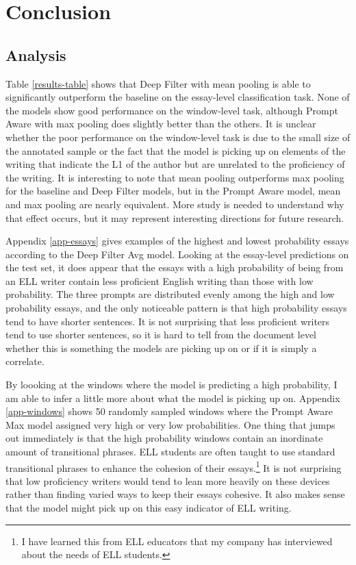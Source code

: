 \documentclass{article} %
\begin{document}
\section{Conclusion} \label{conclusion}

\subsection{Analysis} \label{analysis}

Table \ref{results-table} shows that Deep Filter with mean pooling is able to
significantly outperform the baseline on the essay-level classification task.
None of the models show good performance on the window-level task,
although Prompt Aware with max pooling does slightly better than the others.
It is unclear whether the poor performance on the window-level task is due to
the small size of the annotated sample or the fact that the model is picking
up on elements of the writing that indicate the L1 of the author but are unrelated
to the proficiency of the writing. It is interesting to note that mean pooling
outperforms max pooling for the baseline and Deep Filter models, but in the
Prompt Aware model, mean and max pooling are nearly equivalent. More study is needed
to understand why that effect occurs, but it may represent interesting directions
for future research.

Appendix \ref{app-essays} gives examples of the highest and lowest probability
essays according
to the Deep Filter Avg model. Looking at the essay-level predictions on the test
set, it does appear that the essays with a high probability
of being from an ELL writer contain less proficient English writing than those
with low probability. The three prompts are distributed evenly among the high
and low probability essays, and the only noticeable pattern is that high
probability essays tend to have shorter sentences. It is not surprising that
less proficient writers tend to use shorter sentences, so it is hard to tell
from the document level whether this is something the models are picking up on
or if it is simply a correlate.

By loooking at the windows where the model is predicting a high probability,
I am able to infer a little more about what the model is picking up on. Appendix
\ref{app-windows} shows 50 randomly sampled windows where the Prompt Aware Max model
assigned very high or very low probabilities. One thing that jumps out immediately
is that the high probability windows contain
an inordinate amount of transitional phrases. ELL students are often taught to
use standard transitional phrases to enhance the cohesion of their essays.\footnote{
I have learned this from ELL educators that my company has interviewed about the
needs of ELL students.} It is not surprising that low proficiency writers would
tend to lean more heavily on these devices rather than finding varied ways to
keep their essays cohesive. It also makes sense that the model might pick up on
this easy indicator of ELL writing.
\end{document}
